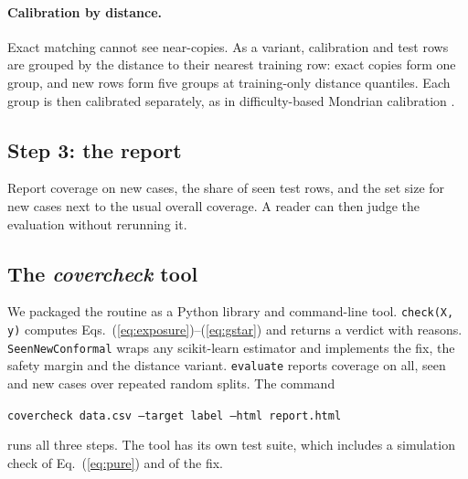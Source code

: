 \paragraph{Calibration by distance.} Exact matching cannot see near-copies. As a variant, calibration and test rows are grouped by the distance to their nearest training row: exact copies form one group, and new rows form five groups at training-only distance quantiles. Each group is then calibrated separately, as in difficulty-based Mondrian calibration \citep{bostrom2020}.

\subsection{Step 3: the report}
Report coverage on new cases, the share of seen test rows, and the set size for new cases next to the usual overall coverage. A reader can then judge the evaluation without rerunning it.

\subsection{The \emph{covercheck} tool}\label{sec:tool}
\begin{sloppypar}
We packaged the routine as a Python library and command-line tool. \texttt{check(X, y)} computes Eqs.~(\ref{eq:exposure})--(\ref{eq:gstar}) and returns a verdict with reasons. \texttt{SeenNewConformal} wraps any scikit-learn estimator and implements the fix, the safety margin and the distance variant. \texttt{evaluate} reports coverage on all, seen and new cases over repeated random splits. The command
\begin{center}\small\texttt{covercheck data.csv --target label --html report.html}\end{center}
runs all three steps. The tool has its own test suite, which includes a simulation check of Eq.~(\ref{eq:pure}) and of the fix.

\end{sloppypar}